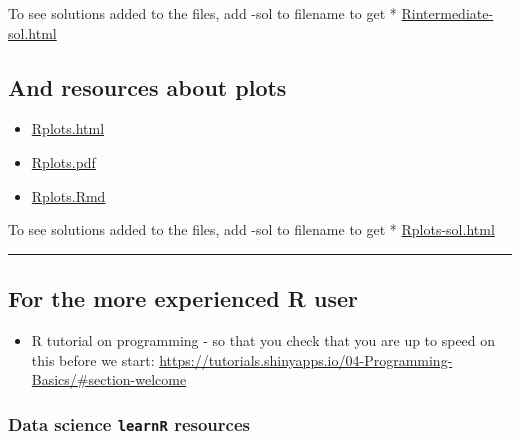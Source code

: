 \documentclass[]{article}
\providecommand{\tightlist}{%
  \setlength{\itemsep}{0pt}\setlength{\parskip}{0pt}}
\begin{document}
To see solutions added to the files, add -sol to filename to get *
\href{https://www.math.ntnu.no/emner/TMA4268/2019v/1Intro/Rintermediate-sol.html}{Rintermediate-sol.html}

\hypertarget{and-resources-about-plots}{%
\subsection{And resources about plots}\label{and-resources-about-plots}}

\begin{itemize}
\tightlist
\item
  \href{https://www.math.ntnu.no/emner/TMA4268/2019v/1Intro/Rplots.html}{Rplots.html}
\item
  \href{https://www.math.ntnu.no/emner/TMA4268/2019v/1Intro/Rplots.pdf}{Rplots.pdf}
\item
  \href{https://www.math.ntnu.no/emner/TMA4268/2019v/1Intro/Rplots.Rmd}{Rplots.Rmd}
\end{itemize}

To see solutions added to the files, add -sol to filename to get *
\href{https://www.math.ntnu.no/emner/TMA4268/2019v/1Intro/Rplots-sol.html}{Rplots-sol.html}

\begin{center}\rule{0.5\linewidth}{\linethickness}\end{center}

\hypertarget{for-the-more-experienced-r-user}{%
\subsection{For the more experienced R
user}\label{for-the-more-experienced-r-user}}

\begin{itemize}
\tightlist
\item
  R tutorial on programming - so that you check that you are up to speed
  on this before we start:
  \url{https://tutorials.shinyapps.io/04-Programming-Basics/\#section-welcome}
\end{itemize}

\hypertarget{data-science-learnr-resources}{%
\subsubsection{\texorpdfstring{Data science \texttt{learnR}
resources}{Data science learnR resources}}\label{data-science-learnr-resources}}
\end{document}
